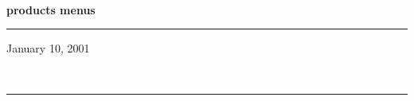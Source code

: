 \documentclass[11pt]{report}
\begin{document}
    \begin{titlepage}

        \vspace*{0.25\textheight}
        \\

\bigskip\noindent
{\Huge\bf products menus}\\
        \rule{\textwidth}{1.5mm}
        \begin{flushright}
            January 10, 2001
        \end{flushright}
        \vfill
        \\
        \rule{\textwidth}{0.75mm}
        \vspace*{0.1\textheight}

    \end{titlepage}

    \setcounter{section}{1}
    \vfil\eject
        
        \vfil\eject
        
        \vfil\eject
        
\end{document}
